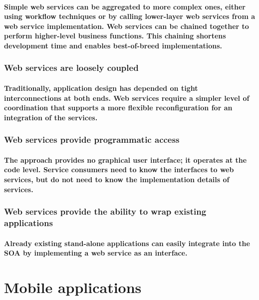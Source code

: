 \documentclass[12pt,a4paper]{article}
\begin{document}
    \paragraph{Simple web services can be aggregated to more complex ones, either using workflow techniques or by calling lower-layer web services from a web service implementation. Web services can be chained together to perform higher-level business functions. This chaining shortens development time and enables best-of-breed implementations.
    }
    
    \subsubsection{Web services are loosely coupled}

    \paragraph{Traditionally, application design has depended on tight interconnections at both ends. Web services require a simpler level of coordination that supports a more flexible reconfiguration for an integration of the services.
    }
    
    \subsubsection{Web services provide programmatic access}

    \paragraph{The approach provides no graphical user interface; it operates at the code level. Service consumers need to know the interfaces to web services, but do not need to know the implementation details of services.
    }
    
    \subsubsection{Web services provide the ability to wrap existing applications}

    \paragraph{Already existing stand-alone applications can easily integrate into the SOA by implementing a web service as an interface.
    }

    \section{Mobile applications}
\end{document}

